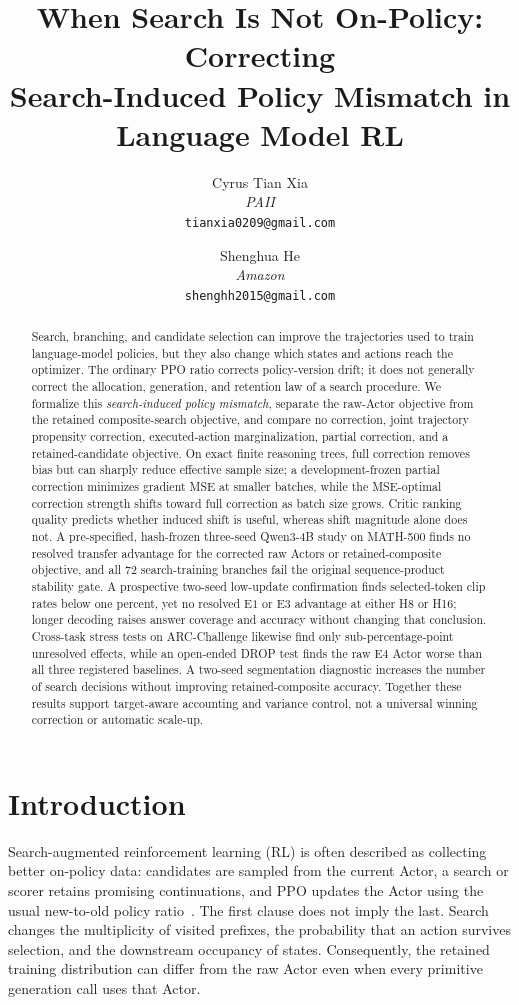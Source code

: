 \documentclass[10pt]{article}
\title{When Search Is Not On-Policy: Correcting\\
Search-Induced Policy Mismatch in Language Model RL}
\author{%
Cyrus Tian Xia\\
\textit{PAII}\\
\texttt{tianxia0209@gmail.com}
\and
Shenghua He\\
\textit{Amazon}\\
\texttt{shenghh2015@gmail.com}%
}
\date{}
\newcommand{\Eone}{\ensuremath{\mathrm{E1}}}
\newcommand{\Ethree}{\ensuremath{\mathrm{E3}}}
\newcommand{\Efour}{\ensuremath{\mathrm{E4}}}
\begin{document}
\maketitle

\begin{abstract}
Search, branching, and candidate selection can improve the trajectories used to
train language-model policies, but they also change which states and actions
reach the optimizer.  The ordinary PPO ratio corrects policy-version drift; it
does not generally correct the allocation, generation, and retention law of a
search procedure.  We formalize this \emph{search-induced policy mismatch},
separate the raw-Actor objective from the retained composite-search objective,
and compare no correction, joint trajectory propensity correction,
executed-action marginalization, partial correction, and a retained-candidate
objective.  On exact finite reasoning trees, full correction removes bias but
can sharply reduce effective sample size; a development-frozen partial
correction minimizes gradient MSE at smaller batches, while the MSE-optimal
correction strength shifts toward full correction as batch size grows.  Critic ranking quality predicts whether induced shift is
useful, whereas shift magnitude alone does not.  A pre-specified, hash-frozen three-seed
Qwen3-4B study on MATH-500 finds no resolved transfer advantage for the
corrected raw Actors or retained-composite objective, and all 72 search-training
branches fail the original sequence-product stability gate.  A prospective
two-seed low-update confirmation finds selected-token clip rates below one
percent, yet no resolved \Eone{} or \Ethree{} advantage at either H8 or H16;
longer decoding raises answer coverage and accuracy without changing that
conclusion.  Cross-task stress tests on ARC-Challenge likewise find only
sub-percentage-point unresolved effects, while an open-ended DROP test finds the
raw \Efour{} Actor worse than all three registered baselines.  A two-seed
segmentation diagnostic increases the number of search decisions without
improving retained-composite accuracy.  Together these results support
target-aware accounting and variance control, not a universal winning
correction or automatic scale-up.
\end{abstract}

\section{Introduction}

Search-augmented reinforcement learning (RL) is often described as collecting
better on-policy data: candidates are sampled from the current Actor, a search
or scorer retains promising continuations, and PPO updates the Actor using the
usual new-to-old policy ratio~\citep{schulman2017ppo}.  The first clause does
not imply the last.  Search changes the multiplicity of visited prefixes, the
probability that an action survives selection, and the downstream occupancy of
states.  Consequently, the retained training distribution can differ from the
raw Actor even when every primitive generation call uses that Actor.
\end{document}
